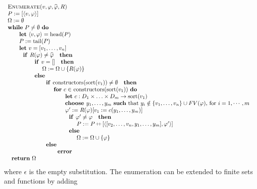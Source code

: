 \documentclass{article}
\providecommand{\concat}{\ensuremath{\hspace{0.12em}\raisebox{0.2ex}{\text{\scriptsize+}\!\text{\scriptsize+}}\hspace{0.12em}}}
\begin{document}
\bigskip 
\[
\begin{tabular}{l}
\textsc{Enumerate(}$v,\varphi ,\widehat{\varphi },R$\textsc{)} \\ 
$P:=[\left\langle v,\varphi \right\rangle ]$ \\ 
$\Omega :=\emptyset $ \\ 
\textbf{while} $P\neq \emptyset $ \textbf{do} \\ 
\qquad \textbf{let} $\left\langle v,\varphi \right\rangle =\mathrm{head}(P)$
\\ 
\qquad $P:=\mathrm{tail}(P)$ \\ 
\qquad \textbf{let} $v=[v_{1},\ldots ,v_{n}]$ \\ 
\qquad $\text{\textbf{if }}R(\varphi )\neq \widehat{\varphi }\text{ \textbf{%
then}}$ \\ 
\qquad \qquad $\text{\textbf{if }}v=[]\text{ \textbf{then}}$ \\ 
\qquad \qquad \qquad $\Omega :=\Omega \cup \left\{ R(\varphi )\right\} $ \\ 
\qquad \qquad $\text{\textbf{else}}$ \\ 
\qquad \qquad \qquad $\text{\textbf{if }}\mathrm{constructors}(\mathrm{sort}%
(v_{1}))\neq \emptyset \text{ \textbf{then}}$ \\ 
\qquad \qquad \qquad \qquad \textbf{for} $c\in $ $\mathrm{constructors}(%
\mathrm{sort}(v_{1}))$ \textbf{do} \\ 
\qquad \qquad \qquad \qquad \qquad \textbf{let} $c:D_{1}\times \ldots \times
D_{m}\rightarrow \mathrm{sort}(v_{1})$ \\ 
\qquad \qquad \qquad \qquad \qquad \textbf{choose }$y_{1},\ldots ,y_{m}$ 
\textbf{such} that $y_{i}\notin \{v_{1},\ldots ,v_{n}\}\cup FV(\varphi )$,
for $i=1,\cdots ,m$ \\ 
\qquad \qquad \qquad \qquad \qquad $\varphi ^{\prime }:=R(\varphi
)[v_{1}:=c(y_{1},\ldots ,y_{m})]$ \\ 
\qquad \qquad \qquad \qquad \qquad $\text{\textbf{if }}\varphi ^{\prime
}\neq \varphi \text{ \textbf{then}}$ \\ 
\qquad \qquad \qquad \qquad \qquad \qquad $P:=P\concat\lbrack \left\langle
[v_{2},\ldots ,v_{n},y_{1},\ldots ,y_{m}],\varphi ^{\prime }\right\rangle ]$
\\ 
\qquad \qquad \qquad \qquad \qquad $\text{\textbf{else}}$ \\ 
\qquad \qquad \qquad \qquad \qquad \qquad $\Omega :=\Omega \cup \left\{
\varphi \right\} $ \\ 
\qquad \qquad \qquad $\text{\textbf{else}}$ \\ 
\qquad \qquad \qquad \qquad $\text{\textbf{error}}$ \\ 
$\text{\textbf{return}}$ $\Omega $%
\end{tabular}%
\]%
where $\epsilon $ is the empty substitution. The enumeration can be extended
to finite sets and functions by adding
\end{document}
